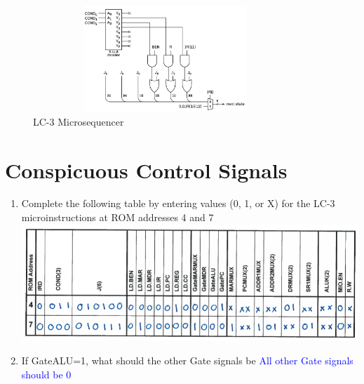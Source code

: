 \documentclass{article}
\begin{document}
\begin{enumerate}[label=(\alph*), itemsep = 50pt]
\begin{figure}[ht]
            \centering
            \includegraphics[width=10cm,height=4cm]{figures/microsequencer.png}
            \caption{LC-3 Microsequencer}
            \label{fig:optionalLabel}
            \end{figure}
        \newpage
    \end{enumerate}

    
    \section{Conspicuous Control Signals}
    \begin{enumerate}[label=(\alph*),itemsep = 10pt]
        \item Complete the following table by entering values (0, 1, or X) for the LC-3 microinstructions at ROM addresses 4 and 7
        \newline 
            \includegraphics[width=1\linewidth]{figures/8a sol.png}
        \item  If GateALU=1, what should the other Gate signals be
        \newline \textcolor{blue}{All other Gate signals should be 0}
    \end{enumerate}

    \newpage
\end{document}
